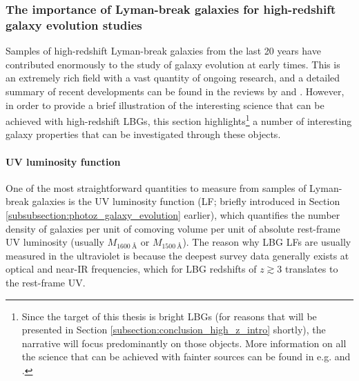 \subsubsection{The importance of Lyman-break galaxies for high-redshift galaxy evolution studies}\label{subsubsection:high_redshift_galaxy_evolution} %
Samples of high-redshift Lyman-break galaxies from the last 20 years have contributed enormously to the study of galaxy evolution at early times. This is an extremely rich field with a vast quantity of ongoing research, and a detailed summary of recent developments can be found in the reviews by  \cite{2013ASSL..396..223D} and \cite{2016PASA...33...37F}. However, in order to provide a brief illustration of the interesting science that can be achieved with high-redshift LBGs, this section highlights\footnote{Since the target of this thesis is bright LBGs (for reasons that will be presented in Section \ref{subsection:conclusion_high_z_intro} shortly), the narrative will focus predominantly on those objects. More information on all the science that can be achieved with fainter sources can be found in e.g. \cite{2013ASSL..396..223D} and \cite{2016PASA...33...37F}.} a number of interesting galaxy properties that can be investigated through these objects. \par


\paragraph{UV luminosity function} One of the most straightforward quantities to measure from samples of Lyman-break galaxies is the UV luminosity function (LF; briefly introduced in Section \ref{subsubsection:photoz_galaxy_evolution} earlier), which quantifies the number density of galaxies per unit of comoving volume per unit of absolute rest-frame UV luminosity (usually $M_{\SI{1600}{\angstrom}}$ or $M_{\SI{1500}{\angstrom}}$). The reason why LBG LFs are usually measured in the ultraviolet is because the deepest survey data generally exists at optical and near-IR frequencies, which for LBG redshifts of $z\gtrsim3$ translates to the rest-frame UV.  \par


